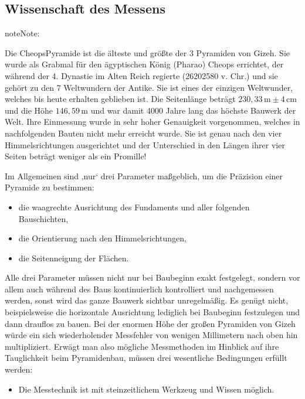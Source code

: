 \documentclass[letterpaper,10pt,english]{jupyterBook}
\begin{document}
\subsection{Wissenschaft des Messens}
\label{\detokenize{content/0_Basics:wissenschaft-des-messens}}
\begin{sphinxadmonition}{note}{Note:}
\sphinxAtStartPar
{}

\sphinxAtStartPar
Die Cheops\sphinxhyphen{}Pyramide ist die älteste und größte der 3 Pyramiden von Gizeh. Sie wurde als Grabmal für den ägyptischen König (Pharao) Cheops errichtet, der während der 4. Dynastie im Alten Reich regierte (2620\sphinxhyphen{}2580 v. Chr.) und sie gehört zu den 7 Weltwundern der Antike. Sie ist eines der einzigen Weltwunder, welches bis heute erhalten geblieben ist.
Die Seitenlänge beträgt \(230,33\,\mathrm m \pm 4\,\mathrm{cm}\) und die Höhe \(146,59\,\mathrm m\) und war damit 4000 Jahre lang das höchste Bauwerk der Welt.
Ihre Einmessung wurde in sehr hoher Genauigkeit vorgenommen, welches in nachfolgenden Bauten nicht mehr erreicht wurde.
Sie ist genau nach den vier Himmelsrichtungen ausgerichtet und der Unterschied in den Längen ihrer vier Seiten beträgt weniger als ein Promille!

\sphinxAtStartPar
Im Allgemeinen sind ‚nur‘ drei Parameter maßgeblich, um die Präzision einer Pyramide zu bestimmen:
\begin{itemize}
\item {} 
\sphinxAtStartPar
die waagrechte Ausrichtung des Fundaments und aller folgenden Bauschichten,

\item {} 
\sphinxAtStartPar
die Orientierung nach den Himmelsrichtungen,

\item {} 
\sphinxAtStartPar
die Seitenneigung der Flächen.

\end{itemize}

\sphinxAtStartPar
Alle drei Parameter müssen nicht nur bei Baubeginn exakt festgelegt, sondern vor allem auch während des Baus kontinuierlich kontrolliert und nachgemessen werden, sonst wird das ganze Bauwerk sichtbar unregelmäßig. Es genügt nicht, beispielsweise die horizontale Ausrichtung lediglich bei Baubeginn festzulegen und dann drauflos zu bauen. Bei der enormen Höhe der großen Pyramiden von Gizeh würde ein sich wiederholender Messfehler von wenigen Millimetern nach oben hin multipliziert.
Erwägt man also mögliche Messmethoden im Hinblick auf ihre Tauglichkeit beim Pyramidenbau, müssen drei wesentliche Bedingungen erfüllt werden:
\begin{itemize}
\item {} 
\sphinxAtStartPar
Die Messtechnik ist mit steinzeitlichem Werkzeug und Wissen möglich.


\end{itemize}
\end{sphinxadmonition}
\end{document}
